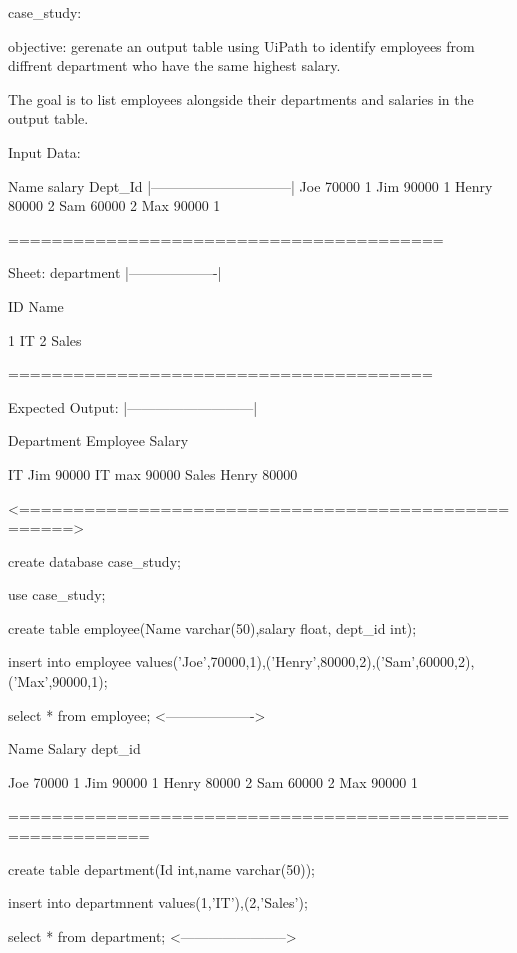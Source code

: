     case_study:

objective:
 gerenate an output table using UiPath to identify employees
 from diffrent department who have the same highest salary.
 
 The goal is to list employees alongside their departments and 
 salaries in the output table.
 
    Input Data:
	
	Name     salary    Dept_Id
  |------------------------------|
	Joe      70000       1
	Jim      90000       1
	Henry    80000       2
	Sam      60000       2
	Max      90000       1
	
	
========================================

  Sheet: department
 |-------------------|
 
  ID   Name
  
  1    IT
  2    Sales
  
=======================================

   Expected Output:
  |---------------------------|
  
  Department  Employee   Salary
  
  IT           Jim       90000
  IT           max       90000
  Sales        Henry     80000


<===================================================>


   create database case_study;
   
   use case_study;
   
   create table employee(Name varchar(50),salary float,
              dept_id int);
			  
	
   insert into employee
         values('Joe',70000,1),('Henry',80000,2),('Sam',60000,2),
		        ('Max',90000,1);
	

   
    select * from employee;
    <-------------------> 

    Name    Salary     dept_id
	
	Joe     70000        1
	Jim     90000        1
	Henry   80000        2
	Sam     60000        2
	Max     90000        1
	

===========================================================

 
   create table department(Id int,name varchar(50));
   
   insert into departmnent
           values(1,'IT'),(2,'Sales');

    
   select * from department;
   <----------------------->

